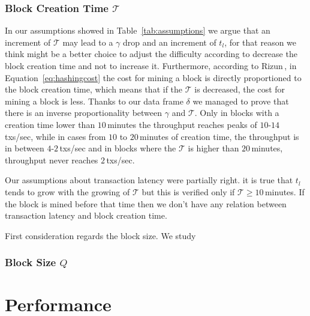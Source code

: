 \documentclass[USenglish]{uit-thesis}
\begin{document}
\subsubsection{Block Creation Time $\mathcal{T}$}
In our assumptions showed in Table~\ref{tab:assumptions} we argue
that an increment of $\mathcal{T}$ may lead to a
$\gamma$ drop and an increment of $t_l$, for that reason we think
might be a better choice to adjust the difficulty according to
decrease the block creation time and not to increase it. Furthermore,
according to Rizun\,\cite{Rizun:2015:blocksizelimit}, in Equation~\ref{eq:hashingcost}
the cost for mining a block is directly proportioned to the block creation
time, which means that if the $\mathcal{T}$ is decreased, the cost for
mining a block is less. Thanks to our data frame $\delta$ we managed to
prove that there is an inverse proportionality between $\gamma$ and
$\mathcal{T}$. Only in blocks with a creation time lower than $10$\,minutes
the throughput reaches peaks of $10$-$14$\,txs/sec, while in
cases from $10$ to $20$\,minutes of creation
time, the throughput is in between
$4$-$2$\,txs/sec and in blocks where the $\mathcal{T}$ is
higher than $20$\,minutes, throughput never reaches
$2$\,txs/sec.

Our assumptions about transaction latency were partially right.
it is true that $t_l$ tends to grow with the growing
of $\mathcal{T}$ but this is verified
only if $\mathcal{T} \geq 10$\,minutes. If the block is mined
before that time then we don't have any relation between
transaction latency and block creation time. %

First consideration regards the block
size. We study

\subsubsection{Block Size $Q$}

\section{Performance}
\label{sec:performance}
\end{document}
